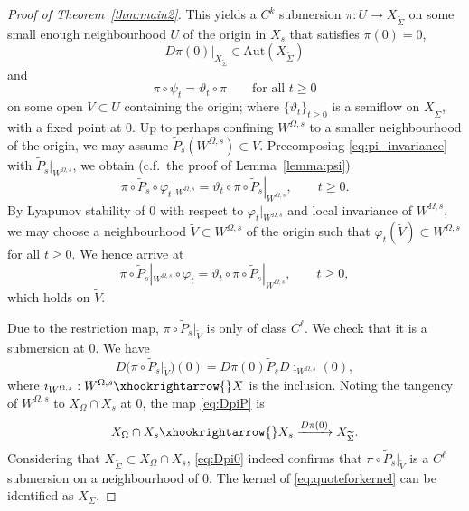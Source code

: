 \documentclass[a4paper, 12pt, oneside, reqno, notitlepage]{amsart}
\theoremstyle{plain}
\theoremstyle{definition}
\theoremstyle{remark}
\begin{document}
\begin{proof}[Proof of Theorem~\ref{thm:main2}]
    This yields a $C^k$ submersion $\pi: U \to X_{\widetilde{\Sigma}}$ on some small enough neighbourhood $U$ of the origin in $X_s$ that satisfies $\pi(0) = 0$, 
    \begin{equation}
        D\pi(0)|_{X_{\widetilde{\Sigma}}} \in \mathrm{Aut}(X_{\widetilde{\Sigma}})
        \label{eq:Dpi0}
    \end{equation}
    and
    \begin{equation}
        \pi \circ \psi_t = \vartheta_t \circ \pi \qquad \text{for all } t \geq 0
        \label{eq:pi_invariance}
    \end{equation}
    on some open $V \subset U$ containing the origin; where $\{ \vartheta_t \}_{t \geq 0}$ is a semiflow on $X_{\widetilde{\Sigma}}$, with a fixed point at $0$.
    Up to perhaps confining $W^{\Omega,s}$ to a smaller neighbourhood of the origin, we may assume $\widetilde{P}_s (W^{\Omega,s}) \subset V$.
    Precomposing \eqref{eq:pi_invariance} with $\widetilde{P}_s|_{W^{\Omega,s}}$, we obtain (c.f.\ the proof of Lemma~\ref{lemma:psi})
    \begin{displaymath}
        \pi \circ \widetilde{P}_s \circ \varphi_t |_{W^{\Omega,s}} = \vartheta_t \circ \pi \circ \widetilde{P}_s|_{W^{\Omega,s}}, \qquad t \geq 0.
    \end{displaymath}
    By Lyapunov stability of $0$ with respect to  $\varphi_t |_{W^{\Omega,s}}$ and local invariance of $W^{\Omega,s}$, we may choose a neighbourhood $\widetilde{V} \subset W^{\Omega,s}$ of the origin such that $\varphi_t(\widetilde{V}) \subset W^{\Omega,s}$ for all $t \geq 0$.
    We hence arrive at
    \begin{equation}
        \pi \circ \widetilde{P}_s |_{W^{\Omega,s}}  \circ \varphi_t = \vartheta_t \circ \pi \circ \widetilde{P}_s|_{W^{\Omega,s}}, \qquad t \geq 0,
        \label{eq:invariance_finale}
    \end{equation}
    which holds on $\widetilde{V}$.
    
    Due to the restriction map, $\pi \circ \widetilde{P}_s |_{\widetilde{V}}$ is only of class $C^\ell$.
    We check that it is a submersion at $0$.
    We have
    \begin{equation}
        D \big( \pi \circ \widetilde{P}_s |_{\widetilde{V}} \big) (0) = D \pi (0) \widetilde{P}_s  D \imath_{W^{\Omega,s}}(0),
        \label{eq:DpiP}
    \end{equation}
    where $\imath_{W^{\Omega,s}}:W^{\Omega,s} \xhookrightarrow{} X$ is the inclusion. 
    Noting the tangency of $W^{\Omega,s}$ to $X_\Omega \cap X_s $ at $0$,
    the map \eqref{eq:DpiP} is
    \begin{equation}
        X_\Omega \cap X_s \xhookrightarrow{} X_s \xrightarrow{D \pi (0)} X_{\widetilde{\Sigma}}.
        \label{eq:quoteforkernel}
    \end{equation}
    Considering that $X_{\widetilde{\Sigma}} \subset X_\Omega \cap X_s$, \eqref{eq:Dpi0} indeed confirms that $\pi \circ \widetilde{P}_s |_{\widetilde{V}}$ is a $C^\ell$ submersion on a neighbourhood of $0$.
    The kernel of \eqref{eq:quoteforkernel} can be identified as $X_{\Sigma}$.
    

\end{proof}
\end{document}
